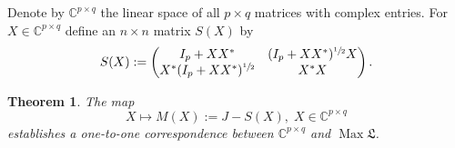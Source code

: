 \documentclass[12pt, a4paper, reqno, twoside]{amsart}
\numberwithin{equation}{section}
\DeclareMathOperator{\Max}{Max}
\newcommand{\frakL}{\mathfrak L}
\newtheorem{theorem}{Theorem}[section]
\theoremstyle{definition}
\theoremstyle{remark}
\theoremstyle{mystyle}
\begin{document}
Denote by $\mathbb C^{p\times q}$ the linear space of all $p\times q$
matrices with complex entries. For $X\in\mathbb C^{p\times q}$ define
an $n\times n$ matrix $S(X)$ by
\begin{equation}
\label{eq5.3a}
S(X):=
\begin{pmatrix}
  I_{p}+XX^{\ast} & (I_{p}+XX^{\ast})^{\sfrac{1}{2}}X \\
  X^{\ast}(I_{p}+XX^{\ast})^{\sfrac{1}{2}} & X^{\ast}X
\end{pmatrix} .
\end{equation}

\begin{theorem}
\label{thm5.5}
The map
\[
X\mapsto M(X) := J - S(X), \; X\in\mathbb C^{p\times q}
\]
establishes a one-to-one correspondence between
$\mathbb C^{p\times q}$ and $\Max\frakL$. 
\end{theorem}
\end{document}
